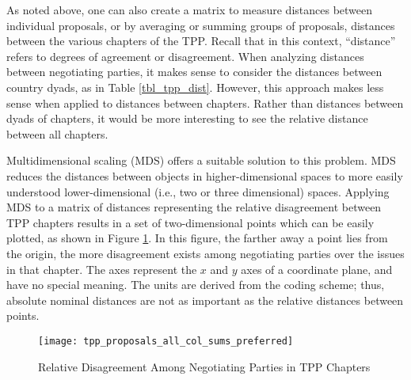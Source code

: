 \documentclass[12pt]{article}
\begin{document}
As noted above, one can also create a matrix to measure distances between 
individual proposals, or by averaging or summing groups of proposals, distances 
between the various chapters of the TPP. Recall that in this context, ``distance'' refers to 
degrees of agreement or disagreement. When analyzing distances between negotiating parties, 
it makes sense to consider the distances between country dyads, as in Table \ref{tbl_tpp_dist}. 
However, this approach makes less sense when applied to distances 
between chapters. Rather than distances between dyads of chapters, it would be more interesting to see 
the relative distance between all chapters.

Multidimensional scaling (MDS) offers a suitable solution to this problem. MDS reduces the distances 
between objects in higher-dimensional spaces to more easily understood lower-dimensional (i.e., two or three dimensional) 
spaces. Applying MDS to a matrix of distances representing the relative disagreement between TPP chapters results in a set of 
two-dimensional 
points which can be easily plotted, as shown in Figure \ref{fig_tpp_chapters}. 
In this figure, the farther away a point lies from the origin, the more disagreement 
exists among negotiating parties over the issues in that chapter.
The axes represent the $x$ and $y$ axes of a 
coordinate plane, and have no special meaning. The units are derived from the coding scheme; thus, 
absolute nominal distances are not as important as the relative distances between points.

\begin{figure}
\caption{Relative Disagreement Among Negotiating Parties in TPP Chapters}
\label{fig_tpp_chapters}
\centering
\texttt{[image: tpp\_proposals\_all\_col\_sums\_preferred]}
\end{figure}
\end{document}
